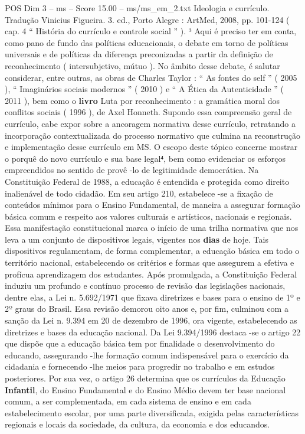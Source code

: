 \begin{textsample}{POS Dim 3 – ms – Score 15.00 – ms/ms\_em\_2.txt}
Ideologia e currículo.
Tradução Vinicius Figueira. 3. ed., Porto Alegre : ArtMed, 2008, pp. 101-124 ( cap. 4 “ História do currículo e controle social ” ). ³ Aqui é preciso ter em conta, como pano de fundo das políticas educacionais, o debate em torno de políticas universais e de políticas da diferença preconizadas a partir da definição de reconhecimento ( intersubjetivo, mútuo ).
No âmbito desse debate, é salutar considerar, entre outras, as obras de Charles Taylor : “ As fontes do self ” ( 2005 ), “ Imaginários sociais modernos ” ( 2010 ) e “ A Ética da Autenticidade ” ( 2011 ), bem como o \textbf{livro} Luta por reconhecimento : a gramática moral dos conflitos sociais ( 1996 ), de Axel Honneth.
Supondo essa compreensão geral de currículo, cabe expor sobre a ancoragem normativa desse currículo, retratando a incorporação contextualizada do processo normativo que culmina na reconstrução e implementação desse currículo em MS.
O escopo deste tópico concerne mostrar o porquê do novo currículo e sua base legal⁴, bem como evidenciar os esforços empreendidos no sentido de provê -lo de legitimidade democrática.
Na Constituição Federal de 1988, a educação é entendida e protegida como direito inalienável de todo cidadão.
Em seu artigo 210, estabelece -se a fixação de conteúdos mínimos para o Ensino Fundamental, de maneira a assegurar formação básica comum e respeito aos valores culturais e artísticos, nacionais e regionais.
Essa manifestação constitucional marca o início de uma trilha normativa que nos leva a um conjunto de dispositivos legais, vigentes nos \textbf{dias} de hoje.
Tais dispositivos regulamentam, de forma complementar, a educação básica em todo o território nacional, estabelecendo os critérios e formas que assegurem a efetiva e profícua aprendizagem dos estudantes.
Após promulgada, a Constituição Federal induziu um profundo e contínuo processo de revisão das legislações nacionais, dentre elas, a Lei n. 5.692/1971 que fixava diretrizes e bases para o ensino de 1º e 2º graus do Brasil.
Essa revisão demorou oito anos e, por fim, culminou com a sanção da Lei n. 9.394 em 20 de dezembro de 1996, ora vigente, estabelecendo as diretrizes e bases da educação nacional.
Da Lei 9.394/1996 destaca -se o artigo 22 que dispõe que a educação básica tem por finalidade o desenvolvimento do educando, assegurando -lhe formação comum indispensável para o exercício da cidadania e fornecendo -lhe meios para progredir no trabalho e em estudos posteriores.
Por sua vez, o artigo 26 determina que os currículos da Educação \textbf{Infantil}, do Ensino Fundamental e do Ensino Médio devem ter base nacional comum, a ser complementada, em cada sistema de ensino e em cada estabelecimento escolar, por uma parte diversificada, exigida pelas características regionais e locais da sociedade, da cultura, da economia e dos educandos.

\end{textsample}
